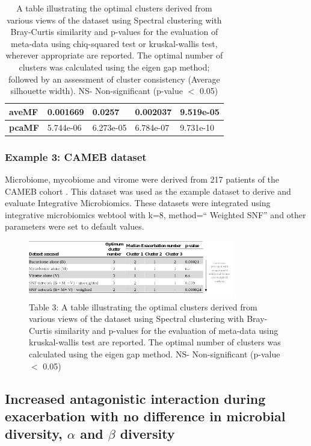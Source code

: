 \begin{table}[H]
\begin{tabular}{|l|l|l|l|l|}
		\textbf{aveMF}           & 0.001669          & 0.0257         & 0.002037              & 9.519e-05                         \\ \hline
		\textbf{pcaMF}           & 5.744e-06         & 6.273e-05      & 6.784e-07             & 9.731e-10                         \\ \hline
	\end{tabular}
	\caption{A table illustrating the optimal clusters derived from various views of the dataset using Spectral clustering with Bray-Curtis similarity and p-values for the evaluation of meta-data using chiq-squared test or kruskal-wallis test, wherever appropriate are reported. The optimal number of clusters was calculated using the eigen gap method; followed by an assessment of cluster consistency (Average silhouette width). NS- Non-significant (p-value $<$ 0.05)}
	\label{tab2}
\end{table}

\subsubsection{Example 3: CAMEB dataset}
Microbiome, mycobiome and virome were derived from 217 patients of the CAMEB cohort \cite{Mac1800766}. This dataset was used as the example dataset to derive and evaluate Integrative Microbiomics. These datasets were integrated using integrative microbiomics webtool with k=8, method=`` Weighted SNF” and other parameters were set to default values.

\begin{figure}[H]
	\centering
	\includegraphics[width=0.8\textwidth]{image/table.png}
	\caption{Table 3: A table illustrating the optimal clusters derived from various views of the dataset using Spectral clustering with Bray-Curtis similarity and p-values for the evaluation of meta-data using kruskal-wallis test are reported. The optimal number of clusters was calculated using the eigen gap method. NS- Non-significant (p-value $<$ 0.05)}
\end{figure}

\subsection{Increased antagonistic interaction during exacerbation with no difference in microbial diversity, $\alpha$ and $\beta$ diversity}

